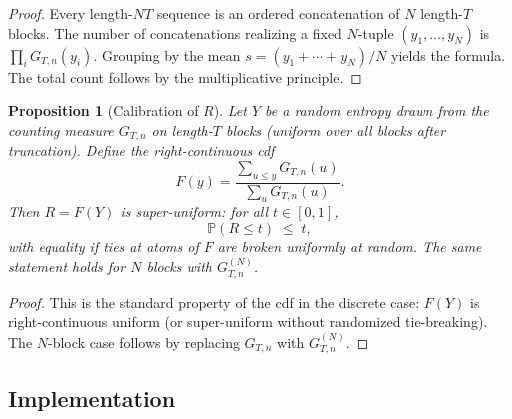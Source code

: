\documentclass{article}
\newtheorem{proposition}{Proposition}[section]
\theoremstyle{remark}
\begin{document}
\begin{proof}
Every length-$NT$ sequence is an ordered concatenation of $N$ length-$T$ blocks. The number of concatenations realizing a fixed $N$-tuple $(y_1,\dots,y_N)$ is $\prod_i G_{T,n}(y_i)$. Grouping by the mean $s=(y_1+\cdots+y_N)/N$ yields the formula. The total count follows by the multiplicative principle.
\end{proof}

\begin{proposition}[Calibration of $R$]
\label{prop:calibration}
Let $Y$ be a random entropy drawn from the counting measure $G_{T,n}$ on length-$T$ blocks (uniform over all blocks after truncation). Define the right-continuous cdf
\begin{equation}
F(y)=\frac{\sum_{u\le y} G_{T,n}(u)}{\sum_{u} G_{T,n}(u)}.
\end{equation}
Then $R=F(Y)$ is super-uniform: for all $t\in[0,1]$,
\begin{equation}
\mathbb{P}(R\le t)\;\le\; t,
\end{equation}
with equality if ties at atoms of $F$ are broken uniformly at random. The same statement holds for $N$ blocks with $G_{T,n}^{(N)}$.
\end{proposition}

\begin{proof}
This is the standard property of the cdf in the discrete case: $F(Y)$ is right-continuous uniform (or super-uniform without randomized tie-breaking). The $N$-block case follows by replacing $G_{T,n}$ with $G_{T,n}^{(N)}$.
\end{proof}

\subsection{Implementation}
\end{document}
